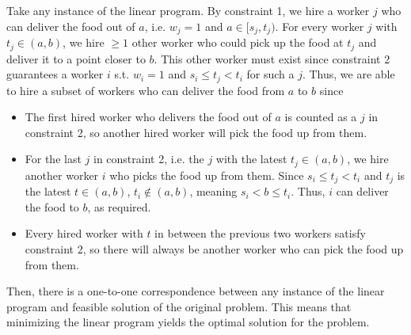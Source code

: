 \documentclass[11pt]{article}
\begin{document}
Take any instance of the linear program. By constraint 1, we hire a worker $j$ who can deliver the food out of $a$, i.e. $w_j=1$ and $a\in [s_j,t_j)$. For every worker $j$ with $t_j\in (a,b)$, we hire $\geq 1$ other worker who could pick up the food at $t_j$ and deliver it to a point closer to $b$. This other worker must exist since constraint 2 guarantees a worker $i$ s.t. $w_i=1$ and $s_i\leq t_j<t_i$ for such a $j$. Thus, we are able to hire a subset of workers who can deliver the food from $a$ to $b$ since

\begin{itemize}
    \item The first hired worker who delivers the food out of $a$ is counted as a $j$ in constraint 2, so another hired worker will pick the food up from them.
    \item For the last $j$ in constraint 2, i.e. the $j$ with the latest $t_j\in (a,b)$, we hire another worker $i$ who picks the food up from them. Since $s_i\leq t_j<t_i$ and $t_j$ is the latest $t\in (a,b)$, $t_i\notin (a,b)$, meaning $s_i<b\leq t_i$. Thus, $i$ can deliver the food to $b$, as required.
    \item Every hired worker with $t$ in between the previous two workers satisfy constraint 2, so there will always be another worker who can pick the food up from them.
\end{itemize}

Then, there is a one-to-one correspondence between any instance of the linear program and feasible solution of the original problem. This means that minimizing the linear program yields the optimal solution for the problem.
\end{document}
